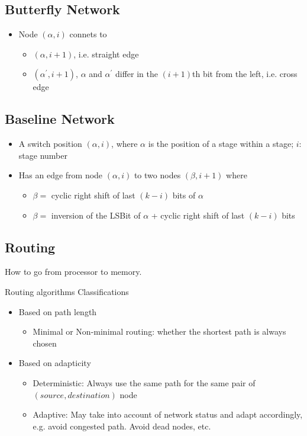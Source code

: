 \documentclass{article}
\begin{document}
\subsection{Butterfly Network}
\begin{itemize}
    \item Node $\left( \alpha , i \right)$ connets to
          \begin{itemize}
              \item $\left( \alpha , i + 1 \right)$, i.e. straight edge
              \item $\left( \alpha^\prime , i + 1 \right)$, $\alpha$ and $\alpha^\prime$ differ in the $\left( i + 1 \right)$th bit from the left, i.e. cross edge
          \end{itemize}

\end{itemize}

\subsection{Baseline Network}
\begin{itemize}
    \item A switch position $\left(\alpha , i\right)$, where $\alpha$ is the position of a stage within a stage; $i$: stage number
    \item Has an edge from node $\left(\alpha , i\right)$ to two nodes $\left(\beta, i + 1\right)$ where
          \begin{itemize}
              \item $\beta =$ cyclic right shift of last $\left( k - i \right)$ bits of $\alpha$
              \item $\beta =$ inversion of the LSBit of $\alpha$ + cyclic right shift of last $\left( k - i \right)$ bits
          \end{itemize}
\end{itemize}

\subsection{Routing}
How to go from processor to memory.

Routing algorithms Classifications
\begin{itemize}
    \item Based on path length
          \begin{itemize}
              \item Minimal or Non-minimal routing: whether the shortest path is always chosen
          \end{itemize}
    \item Based on adapticity
          \begin{itemize}
              \item Deterministic: Always use the same path for the same pair of $\left( source, destination \right)$ node
              \item Adaptive: May take into account of network status and adapt accordingly, e.g. avoid congested path. Avoid dead nodes, etc.
          \end{itemize}
\end{itemize}
\end{document}
